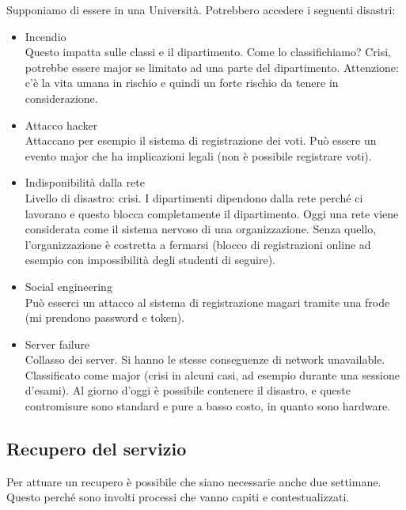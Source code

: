 Supponiamo di essere in una Università.
Potrebbero accedere i seguenti disastri:
\begin{itemize}
 \item Incendio \\
 Questo impatta sulle classi e il dipartimento. Come lo 
classifichiamo? Crisi, potrebbe essere major se limitato ad una parte del 
dipartimento. Attenzione: c'è la vita umana in rischio e quindi un forte 
rischio da tenere in considerazione.

 \item Attacco hacker \\
 Attaccano per esempio il sistema di registrazione dei voti. Può essere un 
evento major che ha implicazioni legali (non \`e possibile registrare voti).

 \item Indisponibilità dalla rete \\
 Livello di disastro: crisi. I dipartimenti dipendono dalla rete perché 
ci lavorano e questo blocca completamente il dipartimento. Oggi una rete viene 
considerata come il sistema nervoso di una organizzazione. Senza quello, 
l'organizzazione \`e costretta a fermarsi (blocco di registrazioni online ad 
esempio con impossibilità degli studenti di seguire).

 \item Social engineering \\
 Può esserci un attacco al sistema di registrazione magari tramite una frode 
(mi prendono password e token).

 \item Server failure \\
 Collasso dei server. Si hanno le stesse conseguenze di network unavailable. 
Classificato come major (crisi in alcuni casi, ad esempio durante una sessione 
d'esami). Al giorno d'oggi \`e possibile contenere il disastro, e queste 
contromisure sono standard e pure a basso costo, in quanto sono hardware.
\end{itemize}

\subsection{Recupero del servizio}

Per attuare un recupero è possibile che siano necessarie anche due settimane. 
Questo perché sono involti processi che vanno capiti e contestualizzati.



